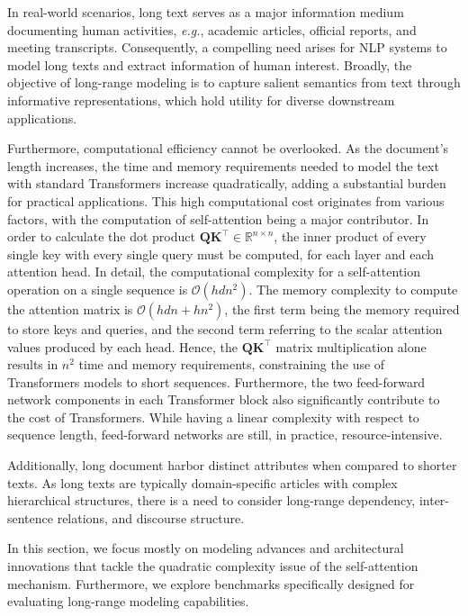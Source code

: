 
In real-world scenarios, long text serves as a major information medium documenting human activities, \textit{e.g.}, academic articles, official reports, and meeting transcripts. Consequently, a compelling need arises for \ac{NLP} systems to model long texts and extract information of human interest. Broadly, the objective of long-range modeling is to capture salient semantics from text through informative representations, which hold utility for diverse downstream applications.
 
Furthermore, computational efficiency cannot be overlooked. As the document's length increases, the time and memory requirements needed to model the text with standard Transformers increase quadratically, adding a substantial burden for practical applications. This high computational cost originates from various factors, with the computation of self-attention being a major contributor. In order to calculate the dot product $\bm{Q}\bm{K}^{\top} \in \mathbb{R}^{n \times n}$, the inner product of every single key with every single query must be computed, for each layer and each attention head.  In detail, the computational complexity for a self-attention operation on a single sequence is $\mathcal{O}(hdn^2)$. The memory complexity to compute the attention matrix is $\mathcal{O}(hdn + hn^2)$, the first term being the memory required to store keys and queries, and the second term referring to the scalar attention values produced by each head. Hence, the $\bm{Q}\bm{K}^{\top}$ matrix multiplication alone results in $n^2$ time and memory requirements, constraining the use of Transformers models to short sequences. Furthermore, the two feed-forward network components in each Transformer block also significantly contribute to the cost of Transformers. While having a linear complexity with respect to sequence length, feed-forward networks are still, in practice, resource-intensive.

Additionally, long document harbor distinct attributes when compared to shorter texts. As long texts are typically domain-specific articles with complex hierarchical structures, there is a need to consider long-range dependency, inter-sentence relations, and discourse structure.

In this section, we focus mostly on modeling advances and architectural innovations that tackle the quadratic complexity issue of the self-attention mechanism. Furthermore, we explore benchmarks specifically designed for evaluating long-range modeling capabilities.

